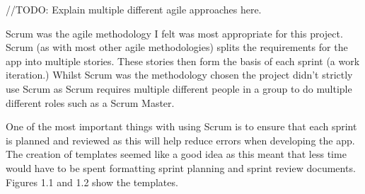 //TODO: Explain multiple different agile approaches here.

Scrum was the agile methodology I felt was most appropriate for this project. Scrum (as with most other agile methodologies) splits the requirements for the app into multiple stories. These stories then form the basis of each sprint (a work iteration.) Whilst Scrum was the methodology chosen the project didn't strictly use Scrum as Scrum requires multiple different people in a group to do multiple different roles such as a Scrum Master. 

One of the most important things with using Scrum is to ensure that each sprint is planned and reviewed as this will help reduce errors when developing the app. The creation of templates seemed like a good idea as this meant that less time would have to be spent formatting sprint planning and sprint review documents. Figures 1.1 and 1.2 show the templates.

